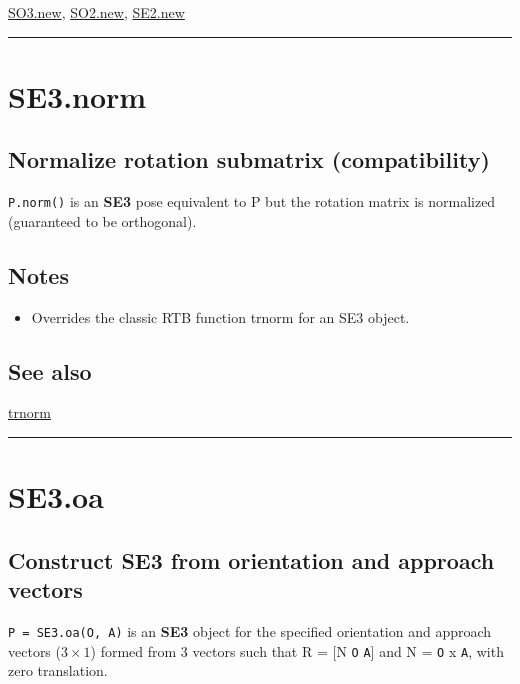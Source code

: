 \hyperlink{SO3.new}{\color{blue} SO3.new}, \hyperlink{SO2.new}{\color{blue} SO2.new}, \hyperlink{SE2.new}{\color{blue} SE2.new}

\vspace{1.5ex}\hrule

\hypertarget{SE3.norm}{\section*{SE3.norm}}
\subsection*{Normalize rotation submatrix (compatibility)}


\texttt{P.norm()} is an \textbf{\color{red} SE3} pose equivalent to P but the rotation
matrix is normalized (guaranteed to be orthogonal).


\subsection*{Notes}
\begin{itemize}
  \item Overrides the classic RTB function trnorm for an SE3 object.
\end{itemize}

\subsection*{See also}


\hyperlink{trnorm}{\color{blue} trnorm}

\vspace{1.5ex}\hrule

\hypertarget{SE3.oa}{\section*{SE3.oa}}
\subsection*{Construct SE3 from orientation and approach vectors}


\texttt{P = SE3.oa(O, A)} is an \textbf{\color{red} SE3} object for the specified
orientation and approach vectors ($3 \times 1$) formed from 3 vectors such that R
= [N \texttt{O} \texttt{A}] and N = \texttt{O} x \texttt{A}, with zero translation.


